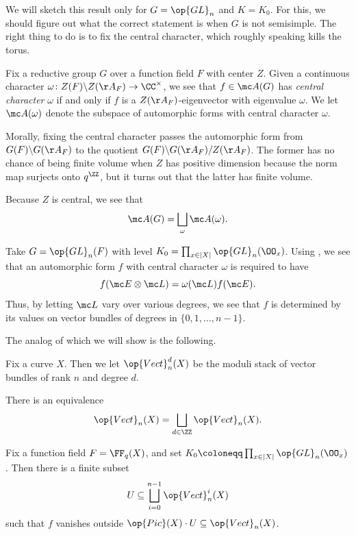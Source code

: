 \documentclass[../notes.tex]{subfiles}
\begin{document}
We will sketch this result only for $G=\op{GL}_n$ and $K=K_0$. For this, we should figure out what the correct statement is when $G$ is not semisimple. The right thing to do is to fix the central character, which roughly speaking kills the torus.
\begin{definition}
	Fix a reductive group $G$ over a function field $F$ with center $Z$. Given a continuous character $\omega\colon Z(F)\backslash Z(\AA_F)\to\CC^\times$, we see that $f\in\mc A(G)$ has \textit{central character} $\omega$ if and only if $f$ is a $Z(\AA_F)$-eigenvector with eigenvalue $\omega$. We let $\mc A(\omega)$ denote the subspace of automorphic forms with central character $\omega$.
\end{definition}
\begin{remark}
	Morally, fixing the central character passes the automorphic form from $G(F)\backslash G(\AA_F)$ to the quotient $G(F)\backslash G(\AA_F)/Z(\AA_F)$. The former has no chance of being finite volume when $Z$ has positive dimension because the norm map surjects onto $q^\ZZ$, but it turns out that the latter has finite volume.
\end{remark}
\begin{remark}
	Because $Z$ is central, we see that
	\[\mc A(G)=\bigsqcup_\omega\mc A(\omega).\]
\end{remark}
\begin{example}
	Take $G=\op{GL}_n(F)$ with level $K_0=\prod_{x\in\left|X\right|}\op{GL}_n(\OO_x)$. Using , we see that an automorphic form $f$ with central character $\omega$ is required to have
	\[f(\mc E\otimes\mc L)=\omega(\mc L)f(\mc E).\]
	Thus, by letting $\mc L$ vary over various degrees, we see that $f$ is determined by its values on vector bundles of degrees in $\{0,1,\ldots,n-1\}$.
\end{example}
The analog of  which we will show is the following.
\begin{notation}
	Fix a curve $X$. Then we let $\op{Vect}_n^d(X)$ be the moduli stack of vector bundles of rank $n$ and degree $d$.
\end{notation}
\begin{remark}
	There is an equivalence
	\[\op{Vect}_n(X)=\bigsqcup_{d\in\ZZ}\op{Vect}_n(X).\]
\end{remark}
\begin{proposition} \label{prop:function-field-cuspidal-fd}
	Fix a function field $F=\FF_q(X)$, and set $K_0\coloneqq\prod_{x\in\left|X\right|}\op{GL}_n(\OO_x)$. Then there is a finite subset
	\[U\subseteq\bigsqcup_{i=0}^{n-1}\op{Vect}_n^i(X)\]
	such that $f$ vanishes outside $\op{Pic}(X)\cdot U\subseteq\op{Vect}_n(X)$.
\end{proposition}
\end{document}
